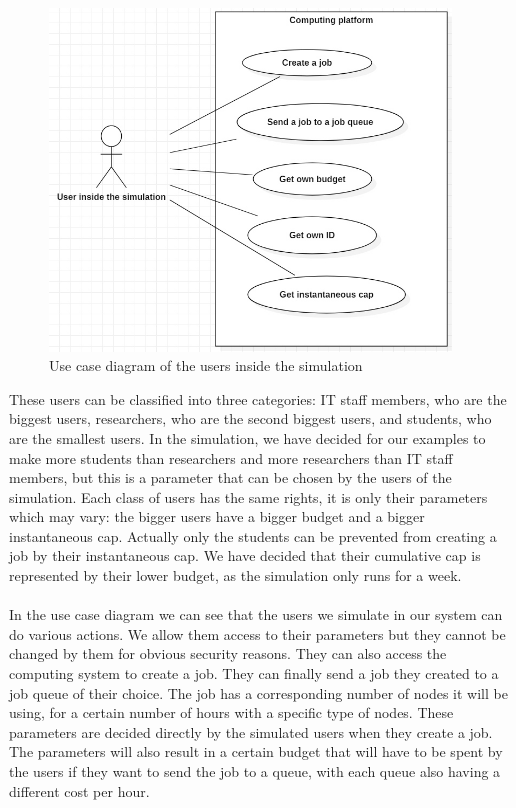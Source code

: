 \documentclass [10 pt, a4 paper]{report}
\begin{document}
\begin{figure}[!htbp]
\centering
\includegraphics[width=0.95\textwidth]{UCD1.jpg}
\caption{\label{fig:image} Use case diagram of the users inside the simulation}
\end{figure}

\noindent
These users can be classified into three categories: IT staff members, who are the biggest users, researchers, who are the second biggest users, and students, who are the smallest users.
In the simulation, we have decided for our examples to make more students than researchers and more researchers than IT staff members, but this is a parameter that can be chosen by the users of the simulation. Each class of users has the same rights, it is only their parameters which may vary: the bigger users have a bigger budget and a bigger instantaneous cap. Actually only the students can be prevented from creating a job by their instantaneous cap. We have decided that their cumulative cap is represented by their lower budget, as the simulation only runs for a week.
\\ \\
In the use case diagram we can see that the users we simulate in our system can do various actions. We allow them access to their parameters but they cannot be changed by them for obvious security reasons. They can also access the computing system to create a job. They can finally send a job they created to a job queue of their choice. The job has a corresponding number of nodes it will be using, for a certain number of hours with a specific type of nodes. These parameters are decided directly by the simulated users when they create a job. The parameters will also result in a certain budget that will have to be spent by the users if they want to send the job to a queue, with each queue also having a different cost per hour.
\end{document}
